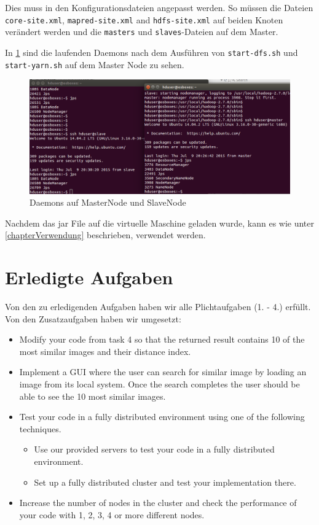 \documentclass[paper=a4, fontsize=11pt]{scrartcl} %
\numberwithin{equation}{section} %
\numberwithin{figure}{section} %
\numberwithin{table}{section} %
\begin{document}
Dies muss in den Konfigurationsdateien angepasst werden. So müssen die Dateien \lstinline$core-site.xml$, \lstinline$mapred-site.xml$ and \lstinline$hdfs-site.xml$ auf beiden Knoten verändert werden und die \lstinline$masters$ und \lstinline$slaves$-Dateien auf dem Master.

In \ref{fig:s4} sind die laufenden Daemons nach dem Ausführen von \lstinline$start-dfs.sh$ und \lstinline$start-yarn.sh$ auf dem Master Node zu sehen. 

\begin{figure}[H]
\begin{center}
	\includegraphics[width=\textwidth]{images/screen4}
	\caption{Daemons auf MasterNode und SlaveNode}
	\label{fig:s4}
\end{center}
\end{figure}

Nachdem das jar File auf die virtuelle Maschine geladen wurde, kann es wie unter \ref{chapterVerwendung} beschrieben, verwendet werden.

\section{Erledigte Aufgaben}
Von den zu erledigenden Aufgaben haben wir alle Plichtaufgaben (1. - 4.) erfüllt. Von den Zusatzaufgaben haben wir umgesetzt:

\begin{itemize}
\item Modify your code from task 4 so that the returned result contains 10 of the most similar images and their distance index.
\item Implement a GUI where the user can search for similar image by loading an image
from its local system. Once the search completes the user should be able to see the
10 most similar images.
\item Test your code in a fully distributed environment using one of the following
techniques.
	\begin{itemize}
	\item Use our provided servers to test your code in a fully distributed environment.
	\item Set up a fully distributed cluster and test your implementation there.
	\end{itemize}
\item Increase the number of nodes in the cluster and check the performance of your code
with 1, 2, 3, 4 or more different nodes.
\end{itemize}
\end{document}
